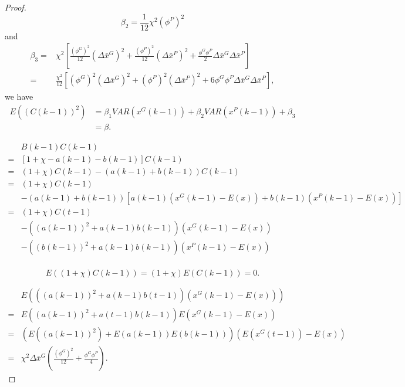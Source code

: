 \begin{proof}
\begin{equation}
\label{eq:def_beta_2}
\beta_{2} = \frac{1}{12} \chi^{2} ( \phi^{P} )^{2}
\end{equation}
and
\begin{equation}
\label{eq:def_beta_3}
\begin{aligned}
\beta_{3} = & \chi^{2} [ \frac{ (\phi^{G})^{2} }{12} (\Delta \bar{x}^{G} )^{2} + \frac{ (\phi^{P})^{2} }{12} (\Delta \bar{x}^{P} )^{2} + \frac{ \phi^{G} \phi^{P} }{2} \Delta \bar{x}^{G} \Delta \bar{x}^{P} ] \\
= & \frac{ \chi^{2} }{ 12 } [ (\phi^{G})^{2} (\Delta \bar{x}^{G} )^{2} + (\phi^{P})^{2} (\Delta \bar{x}^{P} )^{2} + 6 \phi^{G} \phi^{P} \Delta \bar{x}^{G} \Delta \bar{x}^{P} ],
 \end{aligned}
\end{equation}
we have
\begin{equation}
\label{eq:c_2_mean:new}
\begin{aligned}
E( ( C(k-1) )^{2} ) & = \beta_{1} VAR( x^{G}(k-1) ) + \beta_{2} VAR( x^{P}(k-1) ) + \beta_{3} \\
& = \beta .
\end{aligned}
\end{equation}

\begin{equation}
\label{eq:b_c}
\begin{aligned}
& B(k-1)C(k-1) \\
= & [ 1 + \chi - a(k-1) - b(k-1) ] C(k-1) \\
= & (1 + \chi) C(k-1) - ( a(k-1) + b(k-1) ) C(k-1) \\
= & (1 + \chi) C(k-1) \\
& - ( a(k-1) + b(k-1) ) [ a(k-1) ( x^{G}(k-1) - E(x) ) + b(k-1) ( x^{P}(k-1) - E(x) ) ] \\
= & (1 + \chi) C(t-1) \\
& - ( ( a(k-1) )^{2} + a(k-1) b(k-1) ) ( x^{G}(k-1) - E(x) ) \\
& - ( ( b(k-1) )^{2} + a(k-1) b(k-1) ) ( x^{P}(k-1) - E(x) ) \\
\end{aligned}
\end{equation}

\begin{equation}
\label{eq:b_c_mean:1}
E( (1 + \chi) C(k-1) ) = (1 + \chi) E( C(k-1) ) = 0.
\end{equation}

\begin{equation}
\label{eq:b_c_mean:2}
\begin{aligned}
& E( ( ( a(k-1) )^{2} + a(k-1) b(t-1) ) ( x^{G}(k-1) - E(x) ) ) \\
= & E( ( a(k-1) )^{2} + a(t-1) b(k-1) ) E( x^{G}(k-1) - E(x) ) \\
= & ( E( ( a(k-1) )^{2} ) + E( a(k-1) ) E( b(k-1) ) ) ( E(x^{G}(t-1)) - E(x) ) \\
= & \chi^{2} \Delta \bar{x}^{G} ( \frac{ ( \phi^{G} )^{2}}{12} + \frac{ \phi^{G} \phi^{P} }{4} ).
\end{aligned}
\end{equation}


\end{proof}
